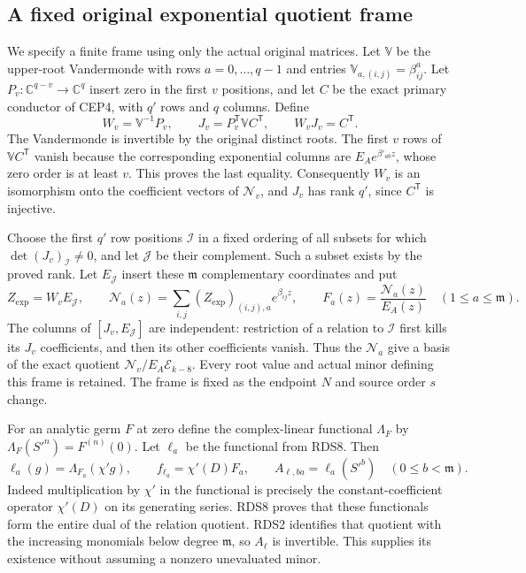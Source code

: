 \documentclass[11pt,a4paper]{article}
\begin{document}
\subsection{A fixed original exponential quotient frame}

We specify a finite frame using only the actual original matrices.
Let $\mathbb V$ be the upper-root Vandermonde with rows
$a=0,\ldots,q-1$ and entries
$\mathbb V_{a,(i,j)}=\beta_{ij}^{a}$.
Let $P_v:\mathbb C^{q-v}\to\mathbb C^q$ insert zero in the
first $v$ positions, and let $C$ be the exact primary conductor
of CEP4, with $q'$ rows and $q$ columns. Define
\[
 W_v=\mathbb V^{-1}P_v,\qquad
 J_v=P_v^{\mathsf T}\mathbb V C^{\mathsf T},\qquad
 W_vJ_v=C^{\mathsf T}.
 \tag{DNE2}
\]
The Vandermonde is invertible by the original distinct roots.
The first $v$ rows of $\mathbb V C^{\mathsf T}$ vanish because
the corresponding exponential columns are
$E_Ae^{\beta'_{ab}z}$, whose zero order is at least $v$.
This proves the last equality. Consequently $W_v$ is an
isomorphism onto the coefficient vectors of $\mathscr N_v$,
and $J_v$ has rank $q'$, since $C^{\mathsf T}$ is injective.

Choose the first $q'$ row positions $\mathcal I$ in a fixed
ordering of all subsets for which $\det (J_v)_{\mathcal I}\ne0$,
and let $\mathcal J$ be their complement. Such a subset exists
by the proved rank. Let $E_{\mathcal J}$ insert these
$\mathfrak m$ complementary coordinates and put
\[
 Z_{\exp}=W_vE_{\mathcal J},\qquad
 \mathcal N_a(z)=
   \sum_{i,j}(Z_{\exp})_{(i,j),a}e^{\beta_{ij}z},
 \qquad F_a(z)=\frac{\mathcal N_a(z)}{E_A(z)}
       \quad(1\le a\le\mathfrak m).
 \tag{DNE3}
\]
The columns of $[J_v,E_{\mathcal J}]$ are independent:
restriction of a relation to $\mathcal I$ first kills its
$J_v$ coefficients, and then its other coefficients vanish.
Thus the $\mathcal N_a$ give a basis of the exact quotient
$\mathscr N_v/E_A\mathscr E_{k-8}$. Every root value and
actual minor defining this frame is retained. The frame is
fixed as the endpoint $N$ and source order $s$ change.

For an analytic germ $F$ at zero define the complex-linear
functional $\Lambda_F$ by
$\Lambda_F(S'^n)=F^{(n)}(0)$. Let $\ell_a$ be the
functional from RDS8. Then
\[
 \ell_a(g)=\Lambda_{F_a}(\chi'g),\qquad
 f_{\ell_a}=\chi'(D)F_a,\qquad
 A_{\ell,ba}=\ell_a(S'^b)\quad(0\le b<\mathfrak m).
 \tag{DNE4}
\]
Indeed multiplication by $\chi'$ in the functional is precisely
the constant-coefficient operator $\chi'(D)$ on its generating
series. RDS8 proves that these functionals form the entire dual
of the relation quotient. RDS2 identifies that quotient with
the increasing monomials below degree $\mathfrak m$, so
$A_\ell$ is invertible. This supplies its existence without
assuming a nonzero unevaluated minor.
\end{document}
